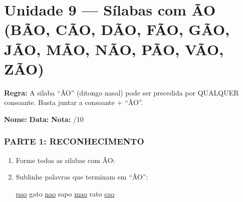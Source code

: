 \chapter{Unidade 9 --- Sílabas com ÃO (BÃO, CÃO, DÃO, FÃO, GÃO, JÃO, MÃO, NÃO, PÃO, VÃO, ZÃO)}


\textbf{Regra:} A silaba ``ÃO'' (ditongo nasal) pode ser precedida por QUALQUER consoante. Basta juntar a consoante + ``ÃO''.

\begin{exercicio}
\noindent\textbf{Nome:} \underline{\hspace{3.2cm}} \quad \textbf{Data:} \underline{\hspace{1.6cm}} \quad \textbf{Nota:} \underline{\hspace{0.9cm}}/10

\subsection*{PARTE 1: RECONHECIMENTO}

\begin{enumerate}
  \item Forme todas as silabas com ÃO:
  \begin{center}
  \end{center}

  \item Sublinhe palavras que terminam em ``ÃO'':
  \begin{center}
  \uline{pao} \quad gato \quad \uline{nao} \quad sapo \quad \uline{mao} \quad rato \quad \uline{cao}
  \end{center}


\end{enumerate}
\end{exercicio}
